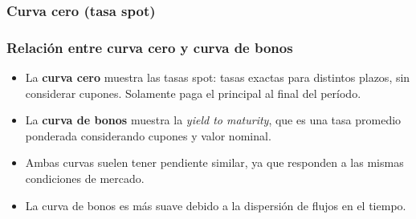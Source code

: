 \documentclass{beamer}
\newif\ifpresentacion
\newcommand{\pausa}{\ifpresentacion\pause\fi}
\begin{document}
\begin{frame}
  \frametitle{Curva cero (tasa spot)}
    \begin{center}
      \end{center}
\end{frame}

\begin{frame}
  \frametitle{Relación entre curva cero y curva de bonos}
  \begin{itemize}
    \item La \textbf{curva cero} muestra las tasas spot: tasas exactas para distintos plazos, sin considerar 
    cupones. Solamente paga el principal al final del período.
    \pausa
    \item La \textbf{curva de bonos} muestra la \textit{yield to maturity}, que es una tasa promedio ponderada considerando cupones y valor nominal.
    \pausa
    \item Ambas curvas suelen tener pendiente similar, ya que responden a las mismas condiciones de mercado.
    \pausa
    \item La curva de bonos es más suave debido a la dispersión de flujos en el tiempo.
  \end{itemize}
  \vspace{1em}
\end{frame}
\end{document}
